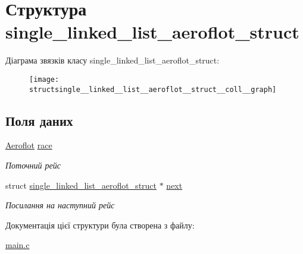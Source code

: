 \hypertarget{structsingle__linked__list__aeroflot__struct}{}\section{Структура single\+\_\+linked\+\_\+list\+\_\+aeroflot\+\_\+struct}
\label{structsingle__linked__list__aeroflot__struct}


Діаграма зв\textquotesingle{}язків класу single\+\_\+linked\+\_\+list\+\_\+aeroflot\+\_\+struct\+:\nopagebreak
\begin{figure}[H]
\begin{center}
\leavevmode
\texttt{[image: structsingle\_\_linked\_\_list\_\_aeroflot\_\_struct\_\_coll\_\_graph]}
\end{center}
\end{figure}
\subsection*{Поля даних}
\begin{DoxyCompactItemize}
\item 
\mbox{\label{structsingle__linked__list__aeroflot__struct_af1c1f161b03433dfe3a7f4028dd58b71}} 
\hyperlink{structAEROFLOT__STRUCT}{Aeroflot} \hyperlink{structsingle__linked__list__aeroflot__struct_af1c1f161b03433dfe3a7f4028dd58b71}{race}
\begin{DoxyCompactList}\small\item\em Поточний рейс \end{DoxyCompactList}\item 
\mbox{\label{structsingle__linked__list__aeroflot__struct_a8aed81380fcda3f4230250e126b28d5e}} 
struct \hyperlink{structsingle__linked__list__aeroflot__struct}{single\+\_\+linked\+\_\+list\+\_\+aeroflot\+\_\+struct} $\ast$ \hyperlink{structsingle__linked__list__aeroflot__struct_a8aed81380fcda3f4230250e126b28d5e}{next}
\begin{DoxyCompactList}\small\item\em Посилання на наступний рейс \end{DoxyCompactList}\end{DoxyCompactItemize}


Документація цієї структури була створена з файлу\+:\begin{DoxyCompactItemize}
\item 
\hyperlink{main_8c}{main.\+c}\end{DoxyCompactItemize}
